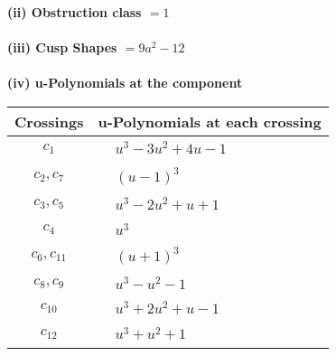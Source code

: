 \documentclass[1p]{elsarticle_modified}
\theoremstyle{definition}
\begin{document}
\flushleft \textbf{(ii) Obstruction class $= 1$}\\~\\
\flushleft \textbf{(iii) Cusp Shapes $= 9 a^2-12$}\\~\\
\newpage\renewcommand{\arraystretch}{1}
\flushleft \textbf{(iv) u-Polynomials at the component}\newline \\
\begin{tabular}{m{50pt}|m{274pt}}
Crossings & \hspace{64pt}u-Polynomials at each crossing \\
\hline $$\begin{aligned}c_{1}\end{aligned}$$&$\begin{aligned}
&u^3-3 u^2+4 u-1
\end{aligned}$\\
\hline $$\begin{aligned}c_{2},c_{7}\end{aligned}$$&$\begin{aligned}
&(u-1)^3
\end{aligned}$\\
\hline $$\begin{aligned}c_{3},c_{5}\end{aligned}$$&$\begin{aligned}
&u^3-2 u^2+u+1
\end{aligned}$\\
\hline $$\begin{aligned}c_{4}\end{aligned}$$&$\begin{aligned}
&u^3
\end{aligned}$\\
\hline $$\begin{aligned}c_{6},c_{11}\end{aligned}$$&$\begin{aligned}
&(u+1)^3
\end{aligned}$\\
\hline $$\begin{aligned}c_{8},c_{9}\end{aligned}$$&$\begin{aligned}
&u^3- u^2-1
\end{aligned}$\\
\hline $$\begin{aligned}c_{10}\end{aligned}$$&$\begin{aligned}
&u^3+2 u^2+u-1
\end{aligned}$\\
\hline $$\begin{aligned}c_{12}\end{aligned}$$&$\begin{aligned}
&u^3+u^2+1
\end{aligned}$\\
\hline
\end{tabular}\\~\\
\end{document}
